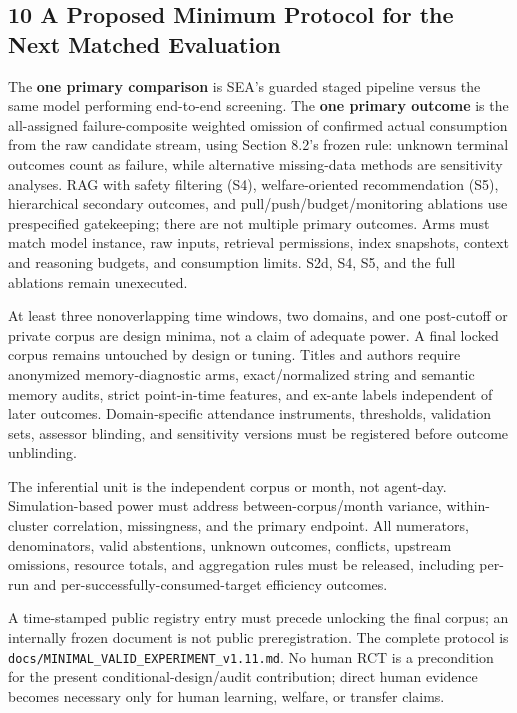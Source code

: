 \documentclass[
  11pt]{article}
\begin{document}
\subsection{10 A Proposed Minimum Protocol for the Next Matched
Evaluation}\label{a-proposed-minimum-protocol-for-the-next-matched-evaluation}

The \textbf{one primary comparison} is SEA's guarded staged pipeline
versus the same model performing end-to-end screening. The \textbf{one
primary outcome} is the all-assigned failure-composite weighted omission
of confirmed actual consumption from the raw candidate stream, using
Section 8.2's frozen rule: unknown terminal outcomes count as failure,
while alternative missing-data methods are sensitivity analyses. RAG
with safety filtering (S4), welfare-oriented recommendation (S5),
hierarchical secondary outcomes, and pull/push/budget/monitoring
ablations use prespecified gatekeeping; there are not multiple primary
outcomes. Arms must match model instance, raw inputs, retrieval
permissions, index snapshots, context and reasoning budgets, and
consumption limits. S2d, S4, S5, and the full ablations remain
unexecuted.

At least three nonoverlapping time windows, two domains, and one
post-cutoff or private corpus are design minima, not a claim of adequate
power. A final locked corpus remains untouched by design or tuning.
Titles and authors require anonymized memory-diagnostic arms,
exact/normalized string and semantic memory audits, strict point-in-time
features, and ex-ante labels independent of later outcomes.
Domain-specific attendance instruments, thresholds, validation sets,
assessor blinding, and sensitivity versions must be registered before
outcome unblinding.

The inferential unit is the independent corpus or month, not agent-day.
Simulation-based power must address between-corpus/month variance,
within-cluster correlation, missingness, and the primary endpoint. All
numerators, denominators, valid abstentions, unknown outcomes,
conflicts, upstream omissions, resource totals, and aggregation rules
must be released, including per-run and per-successfully-consumed-target
efficiency outcomes.

A time-stamped public registry entry must precede unlocking the final
corpus; an internally frozen document is not public preregistration. The
complete protocol is \texttt{docs/MINIMAL\_VALID\_EXPERIMENT\_v1.11.md}.
No human RCT is a precondition for the present conditional-design/audit
contribution; direct human evidence becomes necessary only for human
learning, welfare, or transfer claims.
\end{document}
